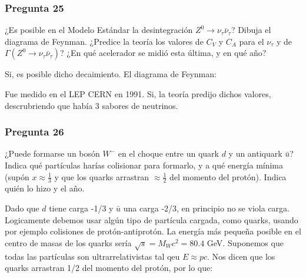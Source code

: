 \begin{Enunciado}
	\subsubsection*{Pregunta 25}

	¿Es posible en el Modelo Estándar la desintegración $Z^0 \to \nu_\tau \bar{\nu}_\tau$? Dibuja el diagrama de Feynman. ¿Predice la teoría los valores de $C_V$ y $C_A$ para el $\nu_\tau$ y de $\Gamma(Z^0 \to \nu_\tau \bar{\nu}_\tau)$? ¿En qué acelerador se midió esta última, y en qué año?

\end{Enunciado}


Si, es posible dicho decaimiento. El diagrama de Feynman:

\begin{figure}[h]
	\centering
\end{figure}

Fue medido en el LEP CERN en 1991. Si, la teoría predijo dichos valores, descrubriendo que había 3 sabores de neutrinos. 

\vspace*{2em}

\begin{Enunciado}
	\subsubsection*{Pregunta 26}

	¿Puede formarse un bosón $W^-$ en el choque entre un quark $d$ y un antiquark $\bar{u}$? Indica qué partículas harías colisionar para formarlo, y a qué energía mínima (supón $x \approx \frac{1}{3}$ y que los quarks arrastran $\approx \frac{1}{2}$ del momento del protón). Indica quién lo hizo y el año.

\end{Enunciado}


Dado que $d$ tiene carga -1/3 y $\bar{u}$ una carga -2/3, en principio no se viola carga. Logicamente debemos usar algún tipo de partícula cargada, como quarks, usando por ejemplo colisiones de protón-antiprotón. La energía más pequeña posible en el centro de masas de los quarks sería $\sqrt{s} = M_W c^2= 80.4$ GeV. Suponemos que todas las partículas son ultrarrelativistas tal qeu $E\approx p c$. Nos dicen que los quarks arrastran 1/2 del momento del protón, por lo que:

